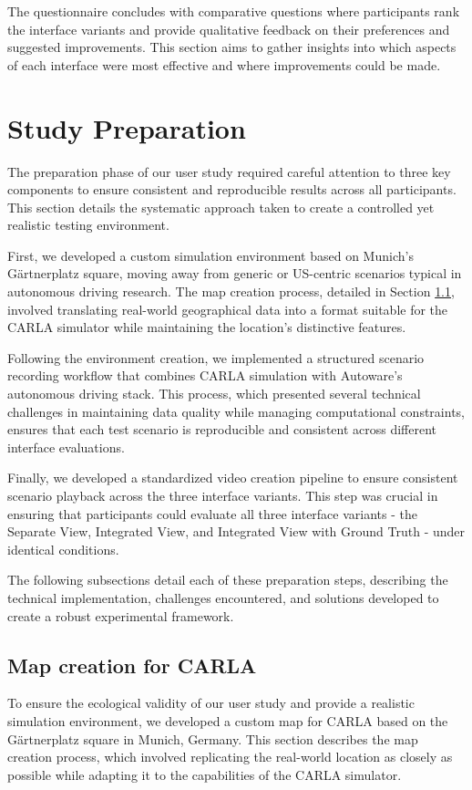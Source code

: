 The questionnaire concludes with comparative questions where participants rank the interface variants and provide qualitative feedback on their preferences and suggested improvements. This section aims to gather insights into which aspects of each interface were most effective and where improvements could be made.
\section{Study Preparation}

The preparation phase of our user study required careful attention to three key components to ensure consistent and reproducible results across all participants. This section details the systematic approach taken to create a controlled yet realistic testing environment.

First, we developed a custom simulation environment based on Munich's Gärtnerplatz square, moving away from generic or US-centric scenarios typical in autonomous driving research. The map creation process, detailed in Section \ref{section:mapcreationforcarla}, involved translating real-world geographical data into a format suitable for the CARLA simulator while maintaining the location's distinctive features.

Following the environment creation, we implemented a structured scenario recording workflow that combines CARLA simulation with Autoware's autonomous driving stack. This process, which presented several technical challenges in maintaining data quality while managing computational constraints, ensures that each test scenario is reproducible and consistent across different interface evaluations.

Finally, we developed a standardized video creation pipeline to ensure consistent scenario playback across the three interface variants. This step was crucial in ensuring that participants could evaluate all three interface variants - the Separate View, Integrated View, and Integrated View with Ground Truth - under identical conditions.

The following subsections detail each of these preparation steps, describing the technical implementation, challenges encountered, and solutions developed to create a robust experimental framework.


\subsection{Map creation for CARLA}\label{section:mapcreationforcarla}
To ensure the ecological validity of our user study and provide a realistic simulation environment, we developed a custom map for CARLA based on the Gärtnerplatz square in Munich, Germany. This section describes the map creation process, which involved replicating the real-world location as closely as possible while adapting it to the capabilities of the CARLA simulator.
